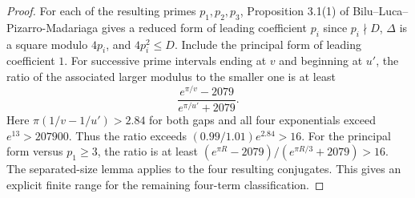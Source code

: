 \begin{proof}
For each of the resulting primes $p_1,p_2,p_3$, Proposition 3.1(1) of
Bilu--Luca--Pizarro-Madariaga gives a reduced form of leading
coefficient $p_i$ since $p_i\nmid D$, $\Delta$ is a square modulo $4p_i$,
and $4p_i^2\le D$. Include the principal form of leading coefficient $1$.
For successive prime intervals ending at $v$ and beginning at $u'$, the
ratio of the associated larger modulus to the smaller one is at least
\[
       \frac{e^{\pi/v}-2079}{e^{\pi/u'}+2079}.
\]
Here $\pi(1/v-1/u')>2.84$ for both gaps and all four exponentials exceed
$e^{13}>207900$. Thus the ratio exceeds $(0.99/1.01)e^{2.84}>16$.
For the principal form versus $p_1\ge3$, the ratio is at least
$(e^{\pi R}-2079)/(e^{\pi R/3}+2079)>16$. The separated-size lemma
applies to the four resulting conjugates. This gives an explicit finite
range for the remaining four-term classification.
\end{proof}
